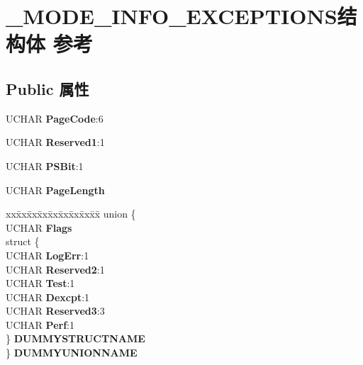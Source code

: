 \hypertarget{struct___m_o_d_e___i_n_f_o___e_x_c_e_p_t_i_o_n_s}{}\section{\+\_\+\+M\+O\+D\+E\+\_\+\+I\+N\+F\+O\+\_\+\+E\+X\+C\+E\+P\+T\+I\+O\+N\+S结构体 参考}
\label{struct___m_o_d_e___i_n_f_o___e_x_c_e_p_t_i_o_n_s}
\subsection*{Public 属性}
\begin{DoxyCompactItemize}
\item 
\mbox{\label{struct___m_o_d_e___i_n_f_o___e_x_c_e_p_t_i_o_n_s_aa9c68413b96e31300fead79d433d5e6e}} 
U\+C\+H\+AR {\bfseries Page\+Code}\+:6
\item 
\mbox{\label{struct___m_o_d_e___i_n_f_o___e_x_c_e_p_t_i_o_n_s_a3a17c5a08bf4b8503e8d60ea37b3cf21}} 
U\+C\+H\+AR {\bfseries Reserved1}\+:1
\item 
\mbox{\label{struct___m_o_d_e___i_n_f_o___e_x_c_e_p_t_i_o_n_s_a137d303dc8215c27bc31f179731790b1}} 
U\+C\+H\+AR {\bfseries P\+S\+Bit}\+:1
\item 
\mbox{\label{struct___m_o_d_e___i_n_f_o___e_x_c_e_p_t_i_o_n_s_a22ec0d9a530f22fe8e143a9cecfc2e92}} 
U\+C\+H\+AR {\bfseries Page\+Length}
\item 
\mbox{\label{struct___m_o_d_e___i_n_f_o___e_x_c_e_p_t_i_o_n_s_a305415657c5a93132a3eb760cacb132c}} 
\begin{tabbing}
xx\=xx\=xx\=xx\=xx\=xx\=xx\=xx\=xx\=\kill
union \{\\
\>UCHAR {\bfseries Flags}\\
\>struct \{\\
\>\>UCHAR {\bfseries LogErr}:1\\
\>\>UCHAR {\bfseries Reserved2}:1\\
\>\>UCHAR {\bfseries Test}:1\\
\>\>UCHAR {\bfseries Dexcpt}:1\\
\>\>UCHAR {\bfseries Reserved3}:3\\
\>\>UCHAR {\bfseries Perf}:1\\
\>\} {\bfseries DUMMYSTRUCTNAME}\\
\} {\bfseries DUMMYUNIONNAME}\\


\end{tabbing}
\end{DoxyCompactItemize}
